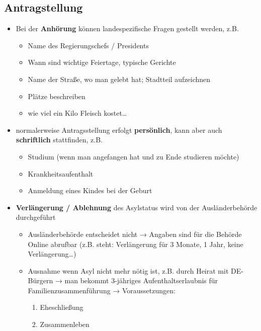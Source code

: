 \documentclass[
]{article}
\providecommand{\tightlist}{%
  \setlength{\itemsep}{0pt}\setlength{\parskip}{0pt}}
\begin{document}
\hypertarget{antragstellung}{%
\subsection{Antragstellung}\label{antragstellung}}

\begin{itemize}
\tightlist
\item
  Bei der \textbf{Anhörung} können landespezifische Fragen gestellt
  werden, z.B.

  \begin{itemize}
  \tightlist
  \item
    Name des Regierungschefs / Presidents
  \item
    Wann sind wichtige Feiertage, typische Gerichte
  \item
    Name der Straße, wo man gelebt hat; Stadtteil aufzeichnen
  \item
    Plätze beschreiben
  \item
    wie viel ein Kilo Fleisch kostet\ldots{}
  \end{itemize}
\item
  normalerweise Antragsstellung erfolgt \textbf{persönlich}, kann aber
  auch \textbf{schriftlich} stattfinden, z.B.

  \begin{itemize}
  \tightlist
  \item
    Studium (wenn man angefangen hat und zu Ende studieren möchte)
  \item
    Krankheitsaufenthalt
  \item
    Anmeldung eines Kindes bei der Geburt
  \end{itemize}
\item
  \textbf{Verlängerung / Ablehnung} des Asylstatus wird von der
  Ausländerbehörde durchgeführt

  \begin{itemize}
  \tightlist
  \item
    Ausländerbehörde entscheidet nicht → Angaben sind für die Behörde
    Online abrufbar (z.B. steht: Verlängerung für 3 Monate, 1 Jahr,
    keine Verlängerung\ldots)
  \item
    Ausnahme wenn Asyl nicht mehr nötig ist, z.B. durch Heirat mit
    DE-Bürgern → man bekommt 3-jähriges Aufenthaltserlaubnis für
    Familienzusammenführung → Voraussetzungen:

    \begin{enumerate}
    \tightlist
    \item
      Eheschließung
    \item
      Zusammenleben
    \end{enumerate}
  \end{itemize}
\end{itemize}
\end{document}
